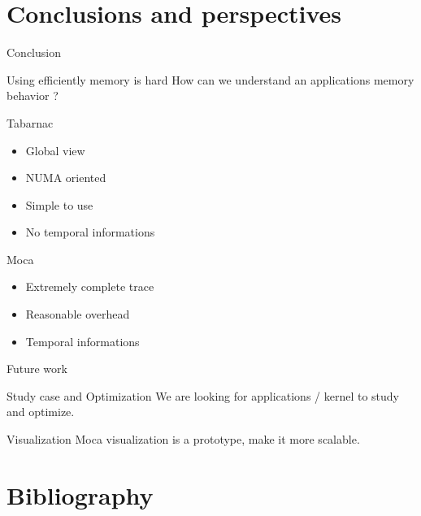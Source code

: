\documentclass[xcolor={usenames,dvipsnames}]{beamer}
\begin{document}
\section{Conclusions and perspectives}
\begin{frame}{Conclusion}
    \begin{exampleblock}{Using efficiently memory is hard}
        How can we understand an applications memory behavior ?
    \end{exampleblock}
    \pause
    \begin{block}{Tabarnac}
        \begin{itemize}
            \item Global view
            \item NUMA oriented
            \item Simple to use
            \item No temporal informations
        \end{itemize}
    \end{block}
    \pause
    \begin{alertblock}{Moca}
        \begin{itemize}
            \item Extremely complete trace
            \item Reasonable overhead
            \item Temporal informations
        \end{itemize}
    \end{alertblock}
\end{frame}

\setcounter{finalframe}{\value{framenumber}}

\begin{frame}{Future work}
    \begin{block}{Study case and Optimization}
        We are looking for applications / kernel to study and optimize.
    \end{block}
    \pause
    \begin{alertblock}{Visualization}
        Moca visualization is a prototype, make it more scalable.
    \end{alertblock}
\end{frame}

\section*{Bibliography}
%


\end{document}
